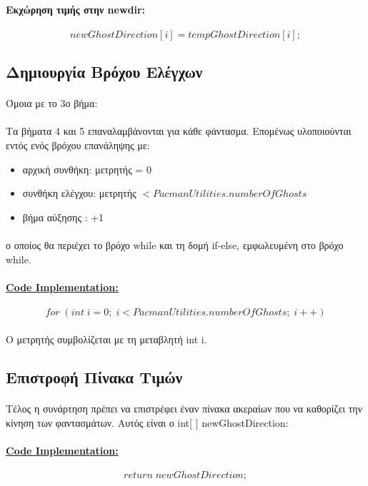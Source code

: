 \documentclass[12pt,a4paper]{article}
\newcommand{\lt}{\latintext}
\newcommand{\gt}{\greektext}
\begin{document}
\paragraph{\gt Εκχώρηση τιμής στην \lt newdir:}
\begin{equation*}
newGhostDirection[i] = tempGhostDirection[i];
\end{equation*}

\subsection{Δημιουργία Βρόχου Ελέγχων}
\paragraph*{}Όμοια με το 3ο βήμα: \\
\paragraph*{}Τα βήματα 4 και 5 επαναλαμβάνονται για κάθε φάντασμα. Επομένως υλοποιούνται εντός ενός βρόχου επανάληψης με:
\begin{itemize}
	\item 	αρχική συνθήκη: μετρητής = 0
	\item 	συνθήκη ελέγχου: μετρητής \lt $< PacmanUtilities.numberOfGhosts$
	\item 	\gt βήμα αύξησης : +1
\end{itemize}
\paragraph*{}ο οποίος θα περιέχει το βρόχο \lt while \gt και τη δομή \lt if-else, \gt εμφωλευμένη στο βρόχο \lt while.
\paragraph{\underline{\lt Code Implementation:}}

\begin{equation*}
for \; (int \; i=0; \;i<PacmanUtilities.numberOfGhosts; \;i++)
\end{equation*}
\paragraph*{} \gt Ο μετρητής συμβολίζεται με τη μεταβλητή \lt int i. \gt
\subsection{Επιστροφή Πίνακα Τιμών}
\paragraph*{}Τέλος η συνάρτηση πρέπει να επιστρέφει έναν πίνακα ακεραίων που να καθορίζει την κίνηση των φαντασμάτων. Αυτός είναι ο \lt int[ \;] \;newGhostDirection:
\paragraph{\underline{\lt Code Implementation:}}

\begin{equation*}
  return \; newGhostDirection;
\end{equation*}
\end{document}
